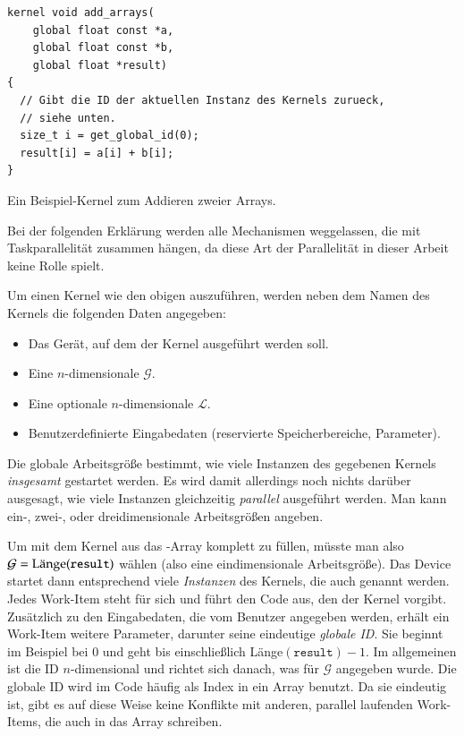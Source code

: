 \begin{listing}
    \begin{verbatim}
kernel void add_arrays(
    global float const *a,
    global float const *b,
    global float *result)
{
  // Gibt die ID der aktuellen Instanz des Kernels zurueck,
  // siehe unten.
  size_t i = get_global_id(0);
  result[i] = a[i] + b[i];
}
    \end{verbatim}
    \caption{Ein Beispiel-Kernel zum Addieren zweier Arrays.}
    \label{lst:opencl_add_arrays_example}
\end{listing}

Bei der folgenden Erklärung werden alle Mechanismen weggelassen, die
mit Taskparallelität zusammen hängen, da diese Art der Parallelität in
dieser Arbeit keine Rolle spielt.

Um einen Kernel wie den obigen auszuführen, werden neben dem Namen des
Kernels die folgenden Daten angegeben:

\begin{itemize}
\item Das Gerät, auf dem der Kernel ausgeführt werden soll.
\item Eine $n$-dimensionale  $\mathcal{G}$.
\item Eine optionale $n$-dimensionale  $\mathcal{L}$.
\item Benutzerdefinierte Eingabedaten (reservierte Speicherbereiche, Parameter).
\end{itemize}

Die globale Arbeitsgröße bestimmt, wie viele Instanzen des gegebenen
Kernels \emph{insgesamt} gestartet werden. Es wird damit allerdings
noch nichts darüber ausgesagt, wie viele Instanzen gleichzeitig
\emph{parallel} ausgeführt werden. Man kann ein-, zwei-, oder
dreidimensionale Arbeitsgrößen angeben.

Um mit dem Kernel aus
 das
-Array komplett zu füllen, müsste man also
$\mathcal{G}=\textnormal{Länge}(\texttt{result})$ wählen (also eine
eindimensionale Arbeitsgröße). Das Device startet dann entsprechend
viele \emph{Instanzen} des Kernels, die auch
 genannt werden. Jedes Work-Item steht für
sich und führt den Code aus, den der Kernel vorgibt. Zusätzlich zu den
Eingabedaten, die vom Benutzer angegeben werden, erhält ein Work-Item
weitere Parameter, darunter seine eindeutige \emph{globale ID}. Sie
beginnt im Beispiel bei $0$ und geht bis einschließlich
Länge$(\texttt{result})-1$. Im allgemeinen ist die ID $n$-dimensional
und richtet sich danach, was für $\mathcal{G}$ angegeben wurde. Die
globale ID wird im Code häufig als Index in ein Array benutzt. Da sie
eindeutig ist, gibt es auf diese Weise keine Konflikte mit anderen,
parallel laufenden Work-Items, die auch in das Array schreiben.

